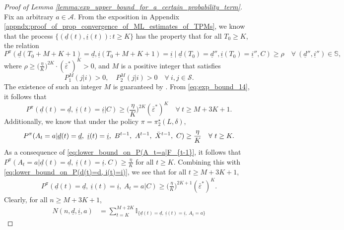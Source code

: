 \begin{proof}[Proof of Lemma \ref{lemma:exp_upper_bound_for_a_certain_probability_term}]
Fix an arbitrary $a\in \mathcal{A}$. From the exposition in Appendix \ref{appndx:proof_of_prop_convergence_of_ML_estimates_of_TPMs}, we know that the process $\{(\underline{d}(t), \underline{i}(t)): t\geq K\}$ has the property that for all $T_0\geq K$, the relation
\begin{equation}
	P^{\pi}(\underline{d}(T_0+M+K+1)=\underline{d}, \underline{i}(T_0+M+K+1)=\underline{i}\mid \underline{d}(T_0)=\underline{d}'', \underline{i}(T_0)=\underline{i}'', C) \geq \rho\quad \forall~(\underline{d}'', \underline{i}'')\in \mathbb{S},
	\label{eq:exp_bound_14}
\end{equation}
where $\rho \geq \bigg(\frac{\eta}{K}\bigg)^{2K}\cdot (\bar{\varepsilon}^*)^K>0$,
and $M$ is a positive integer that satisfies
\begin{equation}
	P_1^M(j|i)>0, \quad P_2^M(j|i)>0\quad \forall ~i, j\in \mathcal{S}.
\end{equation}
The existence of such an integer $M$ is guaranteed by \cite[Proposition 1.7]{levin2017markov}. From \eqref{eq:exp_bound_14}, it follows that
\begin{equation}
		P^\pi(\underline{d}(t)=\underline{d}, ~\underline{i}(t)=\underline{i}|C)\geq \bigg(\frac{\eta}{K}\bigg)^{2K} (\bar{\varepsilon}^*)^K \quad \forall ~t\geq M+3K+1.
		\label{eq:lower_bound_on_P(d(t)=d, i(t)=i)}
\end{equation}
Additionally, we know that under the policy $\pi=\pi_2^\star(L,\delta)$,
\begin{equation}
	P^\pi(A_t=a|\underline{d}(t)=\underline{d}, ~\underline{i}(t)=\underline{i}, ~B^{t-1}, ~A^{t-1}, ~\bar{X}^{t-1}, ~C)\geq \frac{\eta}{K} \quad \forall~t\geq K.
	\label{eq:lower_bound_on_P(A_t=a|F_{t-1}}
\end{equation}
As a consequence of \eqref{eq:lower_bound_on_P(A_t=a|F_{t-1}}, it follows that $P^\pi(A_t=a|\underline{d}(t)=\underline{d}, ~\underline{i}(t)=\underline{i}. ~C)\geq \frac{\eta}{K}$ for all $t\geq K$.
Combining this with \eqref{eq:lower_bound_on_P(d(t)=d, i(t)=i)}, we see that for all $t\geq M+3K+1$,
\begin{align}
	P^\pi(\underline{d}(t)=\underline{d}, ~\underline{i}(t)=\underline{i}, ~A_t=a|C)\geq \bigg(\frac{\eta}{K}\bigg)^{2K+1} (\bar{\varepsilon}^*)^K.
	\label{eq:lower_bound_on_P(d(t)=d, i(t)=i, A_t=a|C)}
\end{align}
Clearly, for all $n\geq M+3K+1$,
\begin{align}
	N(n, \underline{d}, \underline{i}, a)
	&= \sum\limits_{t=K}^{M+2K}\mathbb{I}_{\{\underline{d}(t)=\underline{d}, ~ \underline{i}(t)=\underline{i},~ A_t=a \}}

\end{align}
\end{proof}
